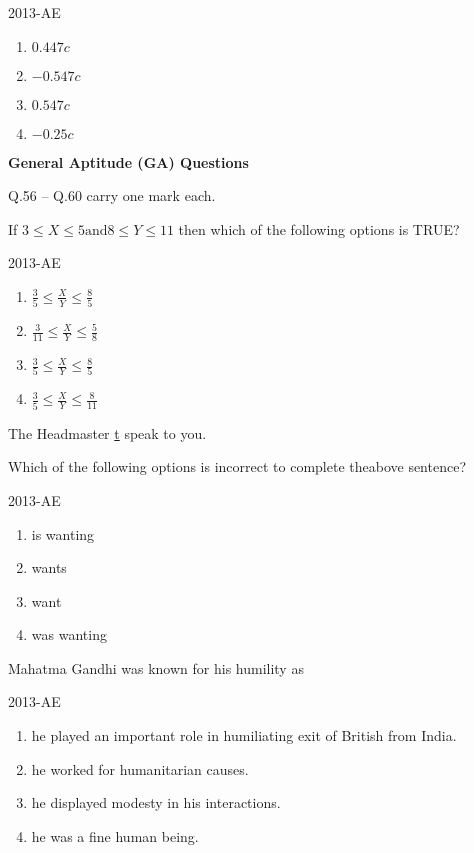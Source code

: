 \hfill{2013-AE}

\begin{enumerate}
    \item $0.447c$
    \item $-0.547c$
    \item $0.547c$
    \item $-0.25c$\\
\end{enumerate}

\textbf{General Aptitude (GA) Questions}

Q.56 -- Q.60 carry one mark each.\\

\item If $3 \leq X \leq 5 \text{and} 8 \leq Y \leq 11$ then which of the following options is TRUE?

\hfill{2013-AE}

\begin{enumerate}
    \item $\frac{3}{5} \leq \frac{X}{Y} \leq \frac{8}{5}$
    \item $\frac{3}{11} \leq \frac{X}{Y} \leq \frac{5}{8}$
    \item $\frac{3}{5} \leq \frac{X}{Y} \leq \frac{8}{5}$
    \item $\frac{3}{5} \leq \frac{X}{Y} \leq \frac{8}{11}$\\
\end{enumerate}

\item The Headmaster \underline t speak to you.

Which of the following options is incorrect to complete theabove sentence?

\hfill{2013-AE}

\begin{enumerate}
    \item is wanting
    \item wants
    \item want
    \item was wanting\\
\end{enumerate}

\item Mahatma Gandhi was known for his humility as

\hfill{2013-AE}

\begin{enumerate}
    \item he played an important role in humiliating exit of British from India.
    \item he worked for humanitarian causes.
    \item he displayed modesty in his interactions.
    \item he was a fine human being.\\
\end{enumerate}

